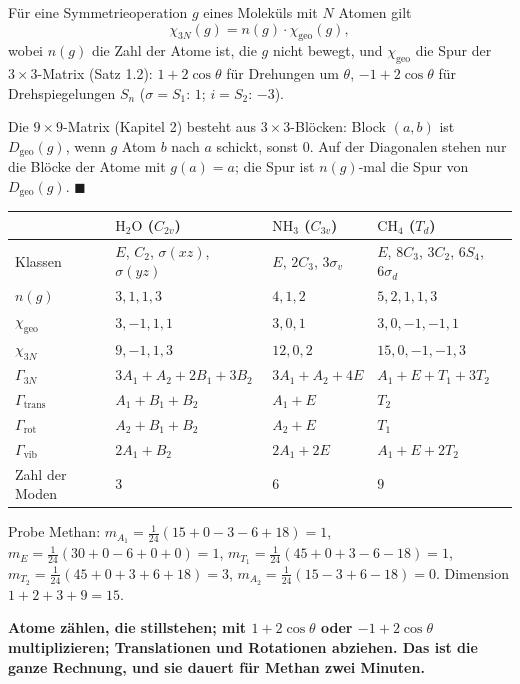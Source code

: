 \begin{merksatz}
Für eine Symmetrieoperation $g$ eines Moleküls mit $N$ Atomen gilt
\[ \chi_{3N}(g) = n(g)\cdot\chi_{\mathrm{geo}}(g), \]
wobei $n(g)$ die Zahl der Atome ist, die $g$ nicht bewegt, und $\chi_{\mathrm{geo}}$ die Spur der $3\times3$-Matrix (Satz 1.2): $1 + 2\cos\theta$ für Drehungen um $\theta$, $-1 + 2\cos\theta$ für Drehspiegelungen $S_n$ ($\sigma = S_1$: $1$; $i = S_2$: $-3$).

Die $9\times9$-Matrix (Kapitel 2) besteht aus $3\times3$-Blöcken: Block $(a, b)$ ist $D_{\mathrm{geo}}(g)$, wenn $g$ Atom $b$ nach $a$ schickt, sonst $0$. Auf der Diagonalen stehen nur die Blöcke der Atome mit $g(a) = a$; die Spur ist $n(g)$-mal die Spur von $D_{\mathrm{geo}}(g)$. $\blacksquare$

\begin{center}
{\small
\renewcommand{\arraystretch}{1.46}
\begin{tabular}{@{}P{2.2cm}P{4.0cm}P{3.2cm}P{3.2cm}@{}}
\toprule
 & $\mathrm{H_2O}$ ($C_{2v}$) & $\mathrm{NH_3}$ ($C_{3v}$) & $\mathrm{CH_4}$ ($T_d$)\\
\midrule
Klassen & $E$, $C_2$, $\sigma(xz)$, $\sigma(yz)$ & $E$, $2C_3$, $3\sigma_v$ & $E$, $8C_3$, $3C_2$, $6S_4$, $6\sigma_d$\\
$n(g)$ & $3, 1, 1, 3$ & $4, 1, 2$ & $5, 2, 1, 1, 3$\\
$\chi_{\mathrm{geo}}$ & $3, -1, 1, 1$ & $3, 0, 1$ & $3, 0, -1, -1, 1$\\
$\chi_{3N}$ & $9, -1, 1, 3$ & $12, 0, 2$ & $15, 0, -1, -1, 3$\\
$\Gamma_{3N}$ & $3A_1 + A_2 + 2B_1 + 3B_2$ & $3A_1 + A_2 + 4E$ & $A_1 + E + T_1 + 3T_2$\\
$\Gamma_{\mathrm{trans}}$ & $A_1 + B_1 + B_2$ & $A_1 + E$ & $T_2$\\
$\Gamma_{\mathrm{rot}}$ & $A_2 + B_1 + B_2$ & $A_2 + E$ & $T_1$\\
$\Gamma_{\mathrm{vib}}$ & $2A_1 + B_2$ & $2A_1 + 2E$ & $A_1 + E + 2T_2$\\
Zahl der Moden & $3$ & $6$ & $9$\\
\bottomrule
\end{tabular}}
\end{center}
Probe Methan: $m_{A_1} = \frac1{24}(15 + 0 - 3 - 6 + 18) = 1$, $m_E = \frac1{24}(30 + 0 - 6 + 0 + 0) = 1$, $m_{T_1} = \frac1{24}(45 + 0 + 3 - 6 - 18) = 1$, $m_{T_2} = \frac1{24}(45 + 0 + 3 + 6 + 18) = 3$, $m_{A_2} = \frac1{24}(15 - 3 + 6 - 18) = 0$. Dimension $1 + 2 + 3 + 9 = 15$. \checkmark

\begin{center}
\begin{minipage}{0.9\textwidth}
\textbf{Atome zählen, die stillstehen; mit $1 + 2\cos\theta$ oder $-1 + 2\cos\theta$ multiplizieren; Translationen und Rotationen abziehen. Das ist die ganze Rechnung, und sie dauert für Methan zwei Minuten.}
\end{minipage}
\end{center}
\end{merksatz}

